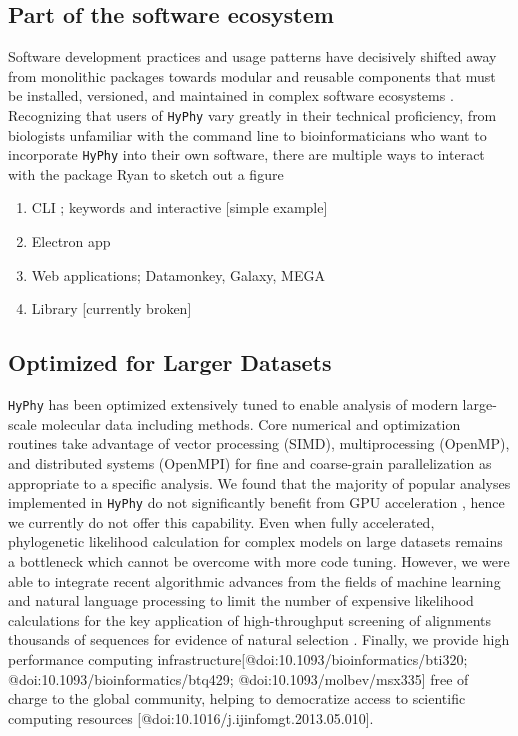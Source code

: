 \documentclass[nogrid]{MBE}%
\newcommand{\revised}[1]{{\color{red}#1}}
\newcommand{\hyphy}{{\tt HyPhy}}
\begin{document}
\subsection{Part of the software ecosystem}

Software development practices and usage patterns have decisively shifted away
from monolithic packages towards modular and reusable components that must be
installed, versioned, and maintained in complex software ecosystems \cite{xx}.
Recognizing that users of \hyphy{} vary greatly in their technical proficiency,
from biologists unfamiliar with the command line to bioinformaticians who want
to incorporate \hyphy{} into their own software, there are multiple ways to
interact with the package \revised{Ryan to sketch out a figure}

\begin{enumerate}
\item CLI ; keywords and interactive [simple example]
\item Electron app
\item Web applications; Datamonkey, Galaxy, MEGA
\item Library [currently broken]
\end{enumerate}

\subsection{Optimized for Larger Datasets} 

\hyphy{} has been optimized extensively tuned to enable analysis of modern
large-scale molecular data including methods. Core numerical and optimization
routines take advantage of vector processing (SIMD), multiprocessing (OpenMP),
and distributed systems (OpenMPI) for fine and coarse-grain parallelization as
appropriate to a specific analysis. We found that the majority of popular
analyses implemented in \hyphy{} do not significantly benefit from GPU
acceleration \cite{stamatakis2019review}, hence we currently do not offer this capability.
Even when fully accelerated, phylogenetic likelihood calculation for complex
models on large datasets remains a bottleneck which cannot be overcome with more
code tuning. However, we were able to integrate recent algorithmic advances from
the fields of machine learning and natural language processing \cite{blei2003latent} to
limit the number of expensive likelihood calculations for the key application of
high-throughput screening of alignments thousands of sequences for evidence of
natural selection \cite{murrell2013fubar}. Finally, we provide high performance computing
infrastructure[@doi:10.1093/bioinformatics/bti320;
@doi:10.1093/bioinformatics/btq429; @doi:10.1093/molbev/msx335] free of charge
to the global community, helping to democratize access to scientific computing
resources [@doi:10.1016/j.ijinfomgt.2013.05.010].
\end{document}
